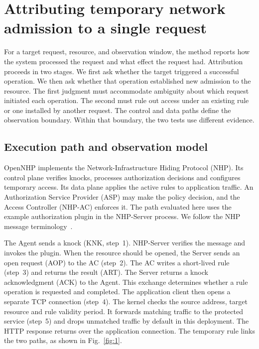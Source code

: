 \section{Attributing temporary network admission to a single request}
\label{sec:method}

For a target request, resource, and observation window, the method reports how the system processed the request and what effect the request had. Attribution proceeds in two stages. We first ask whether the target triggered a successful operation. We then ask whether that operation established new admission to the resource. The first judgment must accommodate ambiguity about which request initiated each operation. The second must rule out access under an existing rule or one installed by another request. The control and data paths define the observation boundary. Within that boundary, the two tests use different evidence.

\subsection{Execution path and observation model}
\label{sec:observation}

OpenNHP implements the Network-Infrastructure Hiding Protocol (NHP). Its control plane verifies knocks, processes authorization decisions and configures temporary access. Its data plane applies the active rules to application traffic. An Authorization Service Provider (ASP) may make the policy decision, and the Access Controller (NHP-AC) enforces it. The path evaluated here uses the example authorization plugin in the NHP-Server process. We follow the NHP message terminology~\citep{r39}.

The Agent sends a knock (KNK, step~1). NHP-Server verifies the message and invokes the plugin. When the resource should be opened, the Server sends an open request (AOP) to the AC (step~2). The AC writes a short-lived rule (step~3) and returns the result (ART). The Server returns a knock acknowledgment (ACK) to the Agent. This exchange determines whether a rule operation is requested and completed. The application client then opens a separate TCP connection (step~4). The kernel checks the source address, target resource and rule validity period. It forwards matching traffic to the protected service (step~5) and drops unmatched traffic by default in this deployment. The HTTP response returns over the application connection. The temporary rule links the two paths, as shown in Fig.~\ref{fig:1}.

